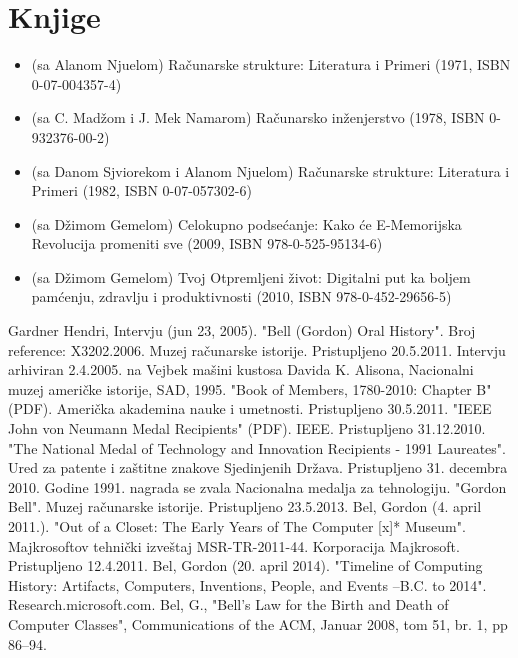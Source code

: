 \documentclass[a4paper]{article}
\begin{document}
{\section{Knjige}
\label{sec:naslov1}


\begin{itemize}
\item (sa Alanom Njuelom) Računarske strukture: Literatura i Primeri (1971, ISBN 0-07-004357-4)
\item (sa C. Madžom i J. Mek Namarom) Računarsko inženjerstvo (1978, ISBN 0-932376-00-2)
\item (sa Danom Sjviorekom i Alanom Njuelom) Računarske strukture: Literatura i Primeri (1982, ISBN 0-07-057302-6)
\item(sa Džimom Gemelom) Celokupno podsećanje: Kako će E-Memorijska Revolucija promeniti sve (2009, ISBN 978-0-525-95134-6)
\item (sa Džimom Gemelom) Tvoj Otpremljeni život: Digitalni put ka boljem pamćenju, zdravlju i produktivnosti (2010, ISBN 978-0-452-29656-5)
\end{itemize} 


\appendix
 


\appendix
\renewcommand{\refname}{Reference}
\begin{thebibliography}{9}
 Gardner Hendri, Intervju (jun 23, 2005). "Bell (Gordon) Oral History". Broj reference: X3202.2006. Muzej računarske istorije. Pristupljeno 20.5.2011. 
 Intervju arhiviran 2.4.2005. na Vejbek mašini kustosa Davida K. Alisona, Nacionalni muzej američke istorije, SAD, 1995.
  "Book of Members, 1780-2010: Chapter B" (PDF). Američka akademina nauke i umetnosti. Pristupljeno 30.5.2011.
 "IEEE John von Neumann Medal Recipients" (PDF). IEEE. Pristupljeno 31.12.2010.
  "The National Medal of Technology and Innovation Recipients - 1991 Laureates". Ured za patente i zaštitne znakove Sjedinjenih Država. Pristupljeno 31. decembra 2010. Godine 1991. nagrada se zvala Nacionalna medalja za tehnologiju.
 "Gordon Bell". Muzej računarske istorije. Pristupljeno 23.5.2013.
  Bel, Gordon (4. april 2011.). "Out of a Closet: The Early Years of The Computer [x]* Museum". Majkrosoftov tehnički izveštaj MSR-TR-2011-44. Korporacija Majkrosoft. Pristupljeno 12.4.2011.
 Bel, Gordon (20. april 2014). "Timeline of Computing History: Artifacts, Computers, Inventions, People, and Events --B.C. to 2014". Research.microsoft.com.
  Bel, G., "Bell’s Law for the Birth and Death of Computer Classes", Communications of the ACM, Januar 2008, tom 51, br. 1, pp 86–94.


\end{thebibliography}}
\end{document}
